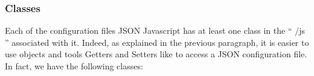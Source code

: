 

\subsubsection{Classes}




Each of the configuration files JSON Javascript has at least one class in the `` /js '' associated with it. Indeed, as explained in the previous paragraph, it is easier to use objects and tools Getters and Setters like to access a JSON configuration file. In fact, we have the following classes:

